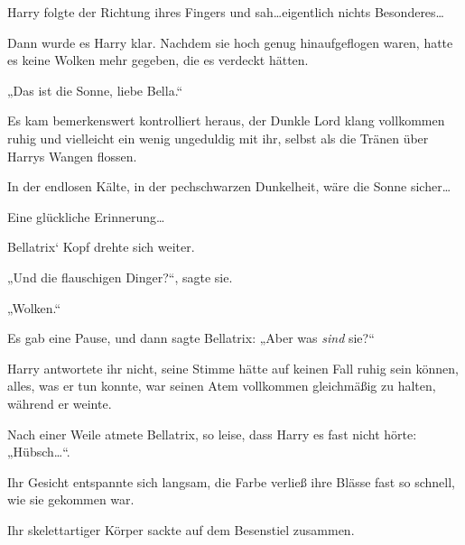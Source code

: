 Harry folgte der Richtung ihres Fingers und sah…eigentlich nichts Besonderes…

Dann wurde es Harry klar. Nachdem sie hoch genug hinaufgeflogen waren, hatte es keine Wolken mehr gegeben, die es verdeckt hätten.

„Das ist die Sonne, liebe Bella.“

Es kam bemerkenswert kontrolliert heraus, der Dunkle Lord klang vollkommen ruhig und vielleicht ein wenig ungeduldig mit ihr, selbst als die Tränen über Harrys Wangen flossen.

In der endlosen Kälte, in der pechschwarzen Dunkelheit, wäre die Sonne sicher…

Eine glückliche Erinnerung…

Bellatrix‘ Kopf drehte sich weiter.

„Und die flauschigen Dinger?“, sagte sie.

„Wolken.“

Es gab eine Pause, und dann sagte Bellatrix: „Aber was \emph{sind} sie?“

Harry antwortete ihr nicht, seine Stimme hätte auf keinen Fall ruhig sein können, alles, was er tun konnte, war seinen Atem vollkommen gleichmäßig zu halten, während er weinte.

Nach einer Weile atmete Bellatrix, so leise, dass Harry es fast nicht hörte: „Hübsch…“.

Ihr Gesicht entspannte sich langsam, die Farbe verließ ihre Blässe fast so schnell, wie sie gekommen war.

Ihr skelettartiger Körper sackte auf dem Besenstiel zusammen.

